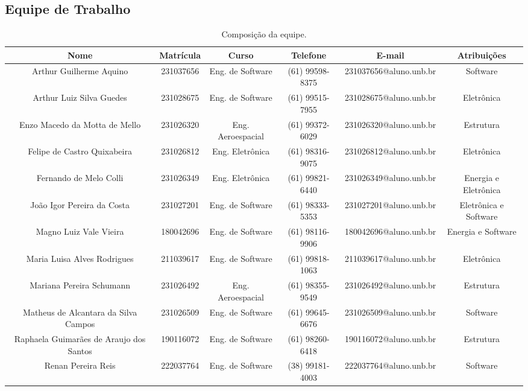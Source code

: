 \begin{landscape}

\chapter{Equipe de Trabalho}

\begin{table}[htpb]
\begin{center}
\caption{Composição da equipe.}
\begin{tabular}{|c|c|c|c|c|c|}
\hline
\textbf{Nome} & \textbf{Matrícula} & \textbf{Curso} & \textbf{Telefone} & \textbf{E-mail} & \textbf{Atribuições}\\ \hline
Arthur Guilherme Aquino & 231037656 & Eng. de Software & (61) 99598-8375 & 231037656@aluno.unb.br  & Software \\ \hline
Arthur Luiz Silva Guedes & 231028675 & Eng. de Software & (61) 99515-7955 & 231028675@aluno.unb.br & Eletrônica \\ \hline
Enzo Macedo da Motta de Mello & 231026320 & Eng. Aeroespacial & (61) 99372-6029 & 231026320@aluno.unb.br & Estrutura \\ \hline
Felipe de Castro Quixabeira & 231026812 & Eng. Eletrônica & (61) 98316-9075 &  231026812@aluno.unb.br & Eletrônica \\ \hline
Fernando de Melo Colli & 231026349 & Eng. Eletrônica & (61) 99821-6440  & 231026349@aluno.unb.br & Energia e Eletrônica  \\ \hline
João Igor Pereira da Costa & 231027201 & Eng. de Software & (61) 98333-5353 & 231027201@aluno.unb.br & Eletrônica e Software \\ \hline
Magno Luiz Vale Vieira & 180042696 & Eng. de Software & (61) 98116-9906 & 180042696@aluno.unb.br & Energia e Software \\ \hline
Maria Luisa Alves Rodrigues & 211039617 & Eng. de Software & (61) 99818-1063 & 211039617@aluno.unb.br & Eletrônica \\ \hline
Mariana Pereira Schumann & 231026492 & Eng. Aeroespacial & (61) 98355-9549 & 231026492@aluno.unb.br & Estrutura \\ \hline
Matheus de Alcantara da Silva Campos & 231026509 & Eng. de Software & (61) 99645-6676 & 231026509@aluno.unb.br & Software \\ \hline
Raphaela Guimarães de Araujo dos Santos & 190116072 & Eng. de Software & (61) 98260-6418 & 190116072@aluno.unb.br & Estrutura \\ \hline
Renan Pereira Reis & 222037764 & Eng. de Software & (38) 99181-4003 & 222037764@aluno.unb.br & Software \\ \hline

\end{tabular}
\end{center}
\end{table}
\end{landscape}
